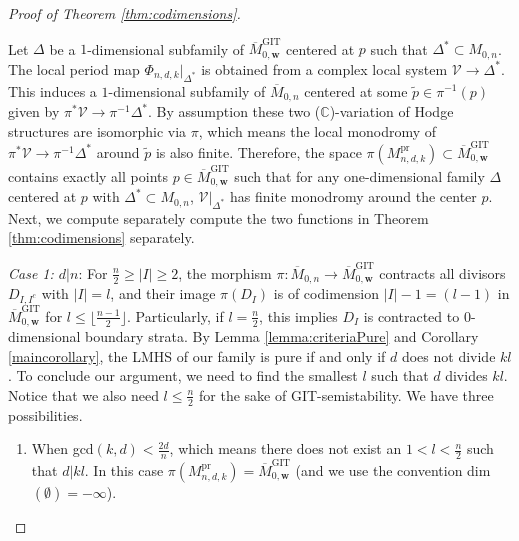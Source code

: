 \documentclass[12pt, letterpaper]{amsart}
\theoremstyle{plain}
\theoremstyle{definition}
\begin{document}
\begin{proof}[Proof of Theorem \ref{thm:codimensions}]
\label{sec:ProorCorollary}

Let $\Delta$ be a $1$-dimensional subfamily of $\overline{M}_{ 0, \mathbf{w} }^{\mathrm{GIT}}$ centered at $p$ such that $\Delta^{*}\subset M_{0,n}$.  The local period map $\Phi_{n,d,k}|_{\Delta^{*}}$ is obtained from a complex local system $\mathcal{V}\rightarrow \Delta^{*}$. This induces a $1$-dimensional subfamily of $\overline{M}_{0,n}$ centered at some $\tilde{p}\in \pi^{-1}(p)$ given by $\pi^{*}\mathcal{V}\rightarrow \pi^{-1}\Delta^{*}$. By assumption these two ($\mathbb{C}$)-variation of Hodge structures are isomorphic via $\pi$, which means the local monodromy of $\pi^{*}\mathcal{V}\rightarrow  \pi^{-1}\Delta^{*}$ around $\tilde{p}$ is also finite.  Therefore, the space $\pi(M_{n,d,k}^{\mathrm{pr}})\subset 
\overline{M}_{ 0,  \mathbf{w}  }^{\mathrm{GIT}}$ 
contains exactly all points $p\in 
\overline{M}_{ 0, \mathbf{w} }^{\mathrm{GIT}}$ such that for any one-dimensional family $\Delta$ centered at $p$ with $\Delta^{*}\subset M_{0,n}$, $\mathcal{V}|_{\Delta^{*}}$ has finite monodromy around the center $p$. Next, we compute separately compute the two functions in Theorem \ref{thm:codimensions} separately.

\noindent\textit{Case 1: $d|n$}:  For $\frac{n}{2} \geq |I| \geq 2$, the morphism $\pi: \overline{M}_{0,n} \to \overline{M}_{0,\mathbf{w}}^{\mathrm{GIT}}$
contracts all divisors $D_{I,I^c}$ with $|I|=l$, and their image 
$\pi\left( D_I \right)$ is of codimension $|I|-1 = (l-1)$  in  $\overline{M}_{0,\mathbf{w}}^{\mathrm{GIT}}$ for $l \leq  \lfloor  \frac{n-1}{2}\rfloor$.
Particularly, if $l=\frac{n}{2}$, this implies $D_I$ is contracted to $0$-dimensional boundary strata.
By Lemma \ref{lemma:criteriaPure} and Corollary  \ref{maincorollary}, the LMHS of our family is pure if and only if $d$ does not divide $kl$. To conclude our argument, we need to find the smallest $l$ such that $d$ divides $kl$. Notice that we also need $l\leq \frac{n}{2}$ for the sake of GIT-semistability. We have three possibilities.

\begin{enumerate}
    
\item When gcd$(k,d)<\frac{2d}{n}$, which means there does not exist an $1<l<\frac{n}{2}$ such that $d|kl$. In this case $\pi(M_{n,d,k}^{\mathrm{pr}})=\overline{M}_{0,\mathbf{w}}^{\mathrm{GIT}}$ (and we use the convention dim$(\emptyset)=-\infty$).


\end{enumerate}
\end{proof}
\end{document}
